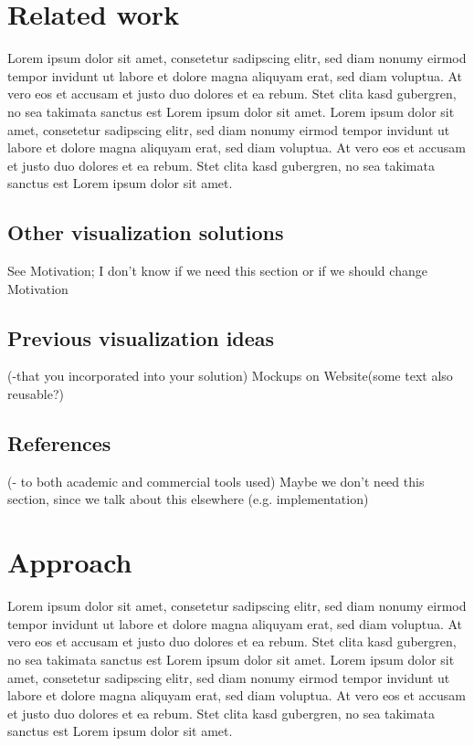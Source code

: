 \documentclass{vgtc}                          %
\begin{document}
\section{Related work}

Lorem ipsum dolor sit amet, consetetur sadipscing elitr, sed diam
nonumy eirmod tempor invidunt ut labore et dolore magna aliquyam erat,
sed diam voluptua. At vero eos et accusam et justo duo dolores et ea
rebum. Stet clita kasd gubergren, no sea takimata sanctus est Lorem
ipsum dolor sit amet. Lorem ipsum dolor sit amet, consetetur
sadipscing elitr, sed diam nonumy eirmod tempor invidunt ut labore et
dolore magna aliquyam erat, sed diam voluptua. At vero eos et accusam
et justo duo dolores et ea rebum. Stet clita kasd gubergren, no sea
takimata sanctus est Lorem ipsum dolor sit amet.

\subsection{Other visualization solutions}
See Motivation; I don't know if we need this section or if we should change Motivation
\subsection{Previous visualization ideas}
(-that you incorporated into your solution)
Mockups on Website(some text also reusable?)
\subsection{References}
(- to both academic and commercial tools used)
Maybe we don't need this section, since we talk about this elsewhere (e.g. implementation)

\section{Approach} %

Lorem ipsum dolor sit amet, consetetur sadipscing elitr, sed diam
nonumy eirmod tempor invidunt ut labore et dolore magna aliquyam erat,
sed diam voluptua. At vero eos et accusam et justo duo dolores et ea
rebum. Stet clita kasd gubergren, no sea takimata sanctus est Lorem
ipsum dolor sit amet. Lorem ipsum dolor sit amet, consetetur
sadipscing elitr, sed diam nonumy eirmod tempor invidunt ut labore et
dolore magna aliquyam erat, sed diam voluptua. At vero eos et accusam
et justo duo dolores et ea rebum. Stet clita kasd gubergren, no sea
takimata sanctus est Lorem ipsum dolor sit amet.
\end{document}
